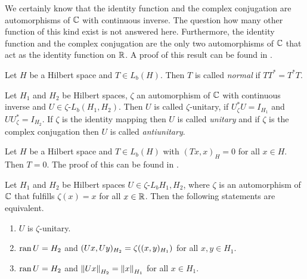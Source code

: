 \begin{remark}
	We certainly know that the identity function and the complex conjugation are automorphisms of $\C$ with continuous inverse. The question how many other function of this kind exist is not answered here. Furthermore, the identity function and the complex conjugation are the only two automorphisms of $\C$ that act as the identity function on $\R$. A proof of this result can be found in \cite[p. 41]{LinAG1&2}. 
\end{remark}


\begin{definition}
	Let $H$ be a Hilbert space and $T\in L_b(H)$. Then $T$ is called \textit{normal} if $TT^\ast = T^\ast T$. 
\end{definition}


\begin{definition}
	Let $H_1$ and $H_2$ be Hilbert spaces, $\zeta$ an automorphism of $\C$ with continuous inverse and $U \in \zeta$-$L_b(H_1, H_2)$. Then $U$ is called $\zeta$-unitary, if $U_\zeta^\ast U = I_{H_1}$ and $U U_\zeta^\ast = I_{H_2}$. If $\zeta$ is the identity mapping then $U$ is called \textit{unitary} and if $\zeta$ is the complex conjugation then $U$ is called \textit{antiunitary}.
\end{definition}


\begin{remark}\label{remark:operator_equivalence_hilbert}
		Let $H$ be a Hilbert space and $T\in L_b(H)$ with $(Tx,x)_H = 0$ for all $x \in H$. Then $T = 0$. The proof of this can be found in \cite[p.142]{FAna1}.
\end{remark}


\begin{proposition} \label{prop:unitary}
	Let $H_1$ and $H_2$ be Hilbert spaces $U \in \zeta$-$L_b{H_1, H_2}$, where $\zeta$ is an automorphism of $\C$ that fulfills $\zeta(x) = x$ for all $x \in \R$. Then the following statements are equivalent.
	\begin{enumerate}[label = (\roman*)]
		\item $U$ is $\zeta$-unitary. 
		\item $\ran U = H_2$ and $(Ux , Uy)_{H_2} = \zeta\pbraces{(x,y)_{H_1}}$ for all $x,y \in H_1$.
		\item $\ran U = H_2$ and $\norm[H_2]{Ux} = \norm[H_1]{x}$ for all $x \in H_1$. 
	\end{enumerate}
\end{proposition}


